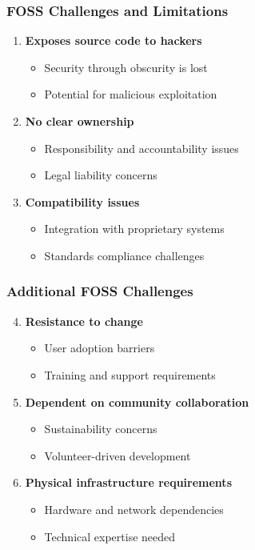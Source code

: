 \documentclass[aspectratio=169]{beamer}
\begin{document}
\begin{frame}
\frametitle{FOSS Challenges and Limitations}
\begin{enumerate}
\item \textbf{Exposes source code to hackers}
    \begin{itemize}
    \item Security through obscurity is lost
    \item Potential for malicious exploitation
    \end{itemize}
\item \textbf{No clear ownership}
    \begin{itemize}
    \item Responsibility and accountability issues
    \item Legal liability concerns
    \end{itemize}
\item \textbf{Compatibility issues}
    \begin{itemize}
    \item Integration with proprietary systems
    \item Standards compliance challenges
    \end{itemize}
\end{enumerate}
\end{frame}

\begin{frame}
\frametitle{Additional FOSS Challenges}
\begin{enumerate}
\setcounter{enumi}{3}
\item \textbf{Resistance to change}
    \begin{itemize}
    \item User adoption barriers
    \item Training and support requirements
    \end{itemize}
\item \textbf{Dependent on community collaboration}
    \begin{itemize}
    \item Sustainability concerns
    \item Volunteer-driven development
    \end{itemize}
\item \textbf{Physical infrastructure requirements}
    \begin{itemize}
    \item Hardware and network dependencies
    \item Technical expertise needed
    \end{itemize}
\end{enumerate}
\end{frame}
\end{document}
